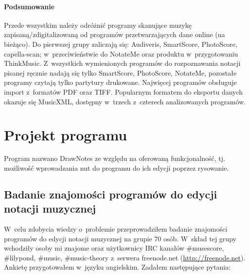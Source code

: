 \documentclass[polish,thesis,12pt]{dcsbook}
\begin{document}
\subsubsection{Podsumowanie}
Przede wszystkim należy odróżnić programy skanujące muzykę zapisaną/zdigitalizowaną od programów przetwarzających dane online (na bieżąco). Do pierwszej grupy zaliczają się: Audiveris, SmartScore, PhotoScore, capella-scan; w~przeciwieństwie do NotateMe oraz produktu w~przygotowaniu ThinkMusic. Z~wszystkich wymienionych programów do rozpoznawania notacji pisanej ręcznie nadają się tylko SmartScore, PhotoScore, NotateMe, pozostałe programy czytają tylko partytury drukowane. Najwięcej programów obsługuje import z~formatów PDF oraz TIFF. Popularnym formatem do eksportu danych okazuje się MusicXML, dostępny w~trzech z~czterech analizowanych programów. 

\chapter{Projekt programu}
Program nazwano DrawNotes ze względu na oferowaną funkcjonalność, tj. możliwość wprowadzania nut do programu do ich edycji poprzez rysowanie.

\section{Badanie znajomości programów do edycji notacji muzycznej}
W~celu zdobycia wiedzy o~problemie przeprowadziłem badanie znajomości programów do edycji notacji muzycznej na grupie 70 osób. W~skład tej grupy wchodziły osoby mi znajome oraz użytkownicy IRC kanałów \#musescore, \#lilypond, \#music, \#music-theory z~serwera freenode.net (\url{http://freenode.net}). Ankietę przygotowałem w~języku angielskim. Zadałem następujące pytania:
\end{document}
